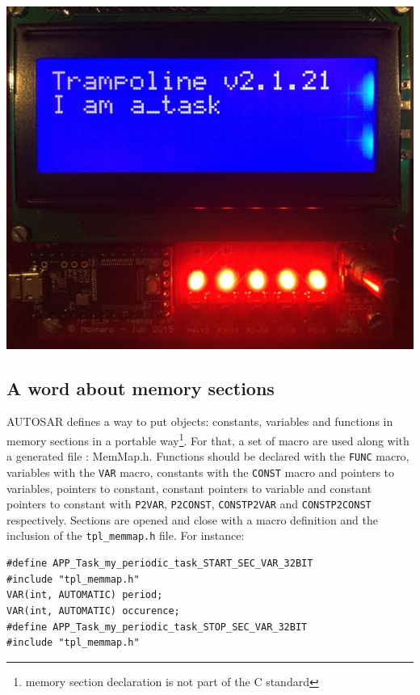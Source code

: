 \documentclass[11pt]{report}
\begin{document}
\begin{center}
   \includegraphics[scale=0.5]{iamatask.jpg} 
\end{center}

\subsection{A word about memory sections}

AUTOSAR defines a way to put objects: constants, variables and functions in memory sections in a portable way\footnote{memory section declaration is not part of the C standard}. For that, a set of macro are used along with a generated file : MemMap.h. Functions should be declared with the \lstinline{FUNC} macro, variables with the \lstinline{VAR} macro, constants with the \lstinline{CONST} macro and pointers to variables, pointers to constant, constant pointers to variable and constant pointers to constant with \lstinline{P2VAR}, \lstinline{P2CONST}, \lstinline{CONSTP2VAR} and \lstinline{CONSTP2CONST} respectively. Sections are opened and close with a macro definition and the inclusion of the \lstinline{tpl_memmap.h} file. For instance:

\begin{lstlisting}
#define APP_Task_my_periodic_task_START_SEC_VAR_32BIT
#include "tpl_memmap.h"
VAR(int, AUTOMATIC) period;
VAR(int, AUTOMATIC) occurence;
#define APP_Task_my_periodic_task_STOP_SEC_VAR_32BIT
#include "tpl_memmap.h"
\end{lstlisting}
\end{document}

